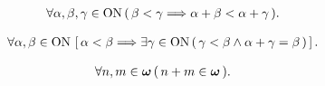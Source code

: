 	\begin{screen}
		\begin{thm}[和は順序を保存する]
			\begin{align}
				\forall \alpha,\beta,\gamma \in \mathrm{ON}\, (\, \beta < \gamma
				\Longrightarrow \alpha + \beta < \alpha + \gamma\, ).
			\end{align}
		\end{thm}
	\end{screen}
	
	\begin{screen}
		\begin{thm}[大小関係を埋め合わせる順序数が取れる]
			\begin{align}
				\forall \alpha,\beta \in \mathrm{ON}\, \left[\, \alpha < \beta
				\Longrightarrow \exists \gamma \in \mathrm{ON}\, (\, \gamma < \beta \wedge \alpha + \gamma = \beta\, )\, \right].
			\end{align}
		\end{thm}
	\end{screen}
	
	\begin{screen}
		\begin{thm}[自然数の和は自然数]\label{thm:sum_of_natural_numbers_is_a_natural_number}
			\begin{align}
				\forall n, m \in {\boldsymbol \omega}\, (\, n + m \in {\boldsymbol \omega}\, ).
			\end{align}
		\end{thm}
	\end{screen}
	
